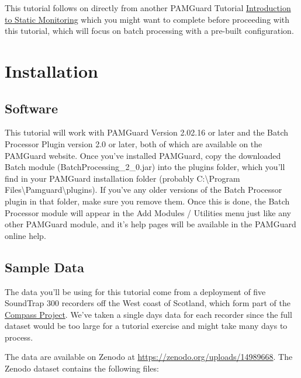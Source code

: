\documentclass[
]{article}
\begin{document}
This tutorial follows on directly from another PAMGuard Tutorial
\href{https://www.pamguard.org/tutorials/staticmonitoring.html}{Introduction
to Static Monitoring} which you might want to complete before proceeding
with this tutorial, which will focus on batch processing with a
pre-built configuration.

\section{Installation}\label{installation}

\subsection{Software}\label{software}

This tutorial will work with PAMGuard Version 2.02.16 or later and the
Batch Processor Plugin version 2.0 or later, both of which are available
on the PAMGuard website. Once you've installed PAMGuard, copy the
downloaded Batch module (BatchProcessing\_2\_0.jar) into the plugins
folder, which you'll find in your PAMGuard installation folder (probably
C:\textbackslash Program
Files\textbackslash Pamguard\textbackslash plugins). If you've any older
versions of the Batch Processor plugin in that folder, make sure you
remove them. Once this is done, the Batch Processor module will appear
in the Add Modules / Utilities menu just like any other PAMGuard module,
and it's help pages will be available in the PAMGuard online help.

\subsection{Sample Data}\label{sample-data}

The data you'll be using for this tutorial come from a deployment of
five SoundTrap 300 recorders off the West coast of Scotland, which form
part of the
\href{https://www.sams.ac.uk/science/projects/compass/}{Compass
Project}. We've taken a single days data for each recorder since the
full dataset would be too large for a tutorial exercise and might take
many days to process.

The data are available on Zenodo at
\url{https://zenodo.org/uploads/14989668}. The Zenodo dataset contains
the following files:
\end{document}
